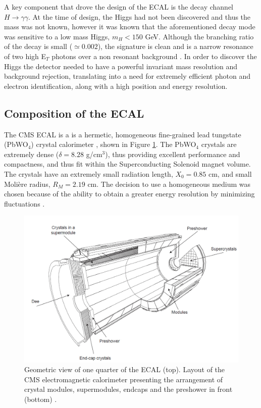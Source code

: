 A key component that drove the design of the ECAL is the decay channel $H \to \gamma\gamma$. At the time of design, the Higgs had not been discovered and thus the mass was not known, however it was known that the aforementioned decay mode was sensitive to a low mass Higgs, $m_H<150$ GeV. Although the branching ratio of the decay is small ($\simeq0.002$), the signature is clean and is a narrow resonance of two high E$_T$ photons over a non resonant background \cite{HiggsProposal}. In order to discover the Higgs the detector needed to have a powerful invariant mass resolution and background rejection, translating into a need for extremely efficient photon and electron identification, along with a high position and energy resolution. 

\subsection{Composition of the ECAL} \label{subsec-ECALComposition}

The CMS ECAL is a is a hermetic, homogeneous fine-grained lead tungstate (PbWO$_4$) crystal calorimeter \cite{ECAL}, shown in Figure \ref{fig-ECAL}. The PbWO$_4$ crystals are extremely dense  ($\delta=8.28$ g/cm$^3$), thus providing excellent performance and compactness, and thus fit within the Superconducting Solenoid magnet volume. The crystals have an extremely small radiation length, $X_0=0.85$ cm, and small Moli\`{e}re radius, $R_M=2.19$ cm. The decision to use a homogeneous medium was chosen because of the ability to obtain a greater energy resolution by minimizing fluctuations \cite{ECAL}. 

\begin{figure} [h!] 
\includegraphics[width=\textwidth]{Figures/ECAL.png}
\caption{Geometric view of one quarter of the ECAL (top). Layout of the CMS electromagnetic calorimeter presenting the arrangement of crystal modules, supermodules, endcaps and the preshower in front (bottom) \cite{CMSexperiment}.}
\label{fig-ECAL}
\end{figure}


